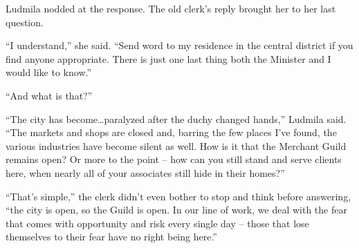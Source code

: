  

Ludmila nodded at the response. The old clerk’s reply brought her to her last question.

 

“I understand,” she said. “Send word to my residence in the central district if you find anyone appropriate. There is just one last thing both the Minister and I would like to know.”



“And what is that?”
 

“The city has become…paralyzed after the duchy changed hands,” Ludmila said. “The markets and shops are closed and, barring the few places I’ve found, the various industries have become silent as well. How is it that the Merchant Guild remains open? Or more to the point – how can you still stand and serve clients here, when nearly all of your associates still hide in their homes?”

 

“That’s simple,” the clerk didn’t even bother to stop and think before answering, “the city is open, so the Guild is open. In our line of work, we deal with the fear that comes with opportunity and risk every single day – those that lose themselves to their fear have no right being here.”